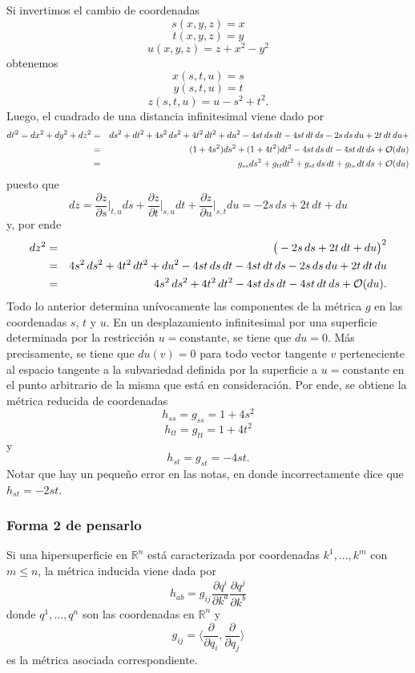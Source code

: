 \documentclass[aps,prl,twocolumn,groupedaddress]{revtex4-2}
\newcommand{\RR}{\mathbb{R}}
\newcommand{\bigo}{\mathcal{O}}
\begin{document}
Si invertimos el cambio de coordenadas
$$
s(x,y,z)=x
$$
$$
t(x,y,z)=y
$$
$$
u(x,y,z)=z+x^2-y^2
$$
obtenemos
$$
x(s,t,u)=s
$$
$$
y(s,t,u)=t
$$
$$
z(s,t,u)=u-s^2+t^2
.
$$
Luego, el cuadrado de una distancia infinitesimal viene dado por
\begin{eqnarray}
d\ell^2
=
dx^2
+
dy^2
+
dz^2
&=&
ds^2
+
dt^2
+
4s^2\,ds^2
+
4t^2\,dt^2
+
du^2
-
4st\,ds\,dt
-
4st\,dt\,ds
-
2s\,ds\,du
+
2t\,dt\,du
+
\notag
\\
&=&
(1+4s^2)ds^2
+
(1+4t^2)dt^2
-
4st\,ds\,dt
-
4st\,dt\,ds
+
\bigo(du)
\notag
\\
&=&
g_{ss}ds^2
+
g_{tt}dt^2
+
g_{st}\,ds\,dt
+
g_{ts}\,dt\,ds
+
\bigo(du)
\notag
\end{eqnarray}
puesto que
$$
dz
=
\frac{\partial z}{\partial s}\bigg|_{t,u}
ds
+
\frac{\partial z}{\partial t}\bigg|_{s,u}
dt
+
\frac{\partial z}{\partial u}\bigg|_{s,t}
du
=
-2s\,ds
+2t\,dt
+du
$$
y, por ende
\begin{eqnarray}
dz^2
&=&
\big(
-2s\,ds
+2t\,dt
+du
\big)^2
\notag
\\
&=&
4s^2\,ds^2
+
4t^2\,dt^2
+
du^2
-
4st\,ds\,dt
-
4st\,dt\,ds
-
2s\,ds\,du
+
2t\,dt\,du
\notag
\\
&=&
4s^2\,ds^2
+
4t^2\,dt^2
-
4st\,ds\,dt
-
4st\,dt\,ds
+
\bigo(du)
.
\notag
\end{eqnarray}
Todo lo anterior determina unívocamente las componentes de la m\'etrica $g$ en las coordenadas $s$, $t$ y $u$.
En un desplazamiento infinitesimal por una superficie determinada por la restricci\'on $u=\mathrm{constante}$, se tiene que $du=0$.
M\'as precisamente, se tiene que $du(v)=0$ para todo vector tangente $v$ perteneciente al espacio tangente a la subvariedad definida por la superficie a $u=\mathrm{constante}$ en el punto arbitrario de la misma que está en consideración.
Por ende, se obtiene la m\'etrica reducida de coordenadas
$$
h_{ss} = g_{ss} = 1+4s^2
$$
$$
h_{tt} = g_{tt} = 1+4t^2
$$
y
$$
h_{st} = g_{st} = -4st
.
$$
Notar que hay un pequeño error en las notas, en donde incorrectamente dice que $h_{st}=-2st$.

\subsubsection{Forma 2 de pensarlo}

Si una hipersuperficie en $\RR^n$ está caracterizada por coordenadas $k^1,...,k^m$ con $m\leq n$, la métrica inducida viene dada por
$$
h_{ab}
=
g_{ij}
\frac{\partial q^i}{\partial k^a}
\frac{\partial q^j}{\partial k^b}
$$
donde $q^1,...,q^n$ son las coordenadas en $\RR^n$ y 
$$
g_{ij} 
= 
\bigg\langle 
\frac{\partial}{\partial q_i} 
,
\frac{\partial}{\partial q_j} 
\bigg\rangle
$$ 
es la métrica asociada correspondiente.
\end{document}
